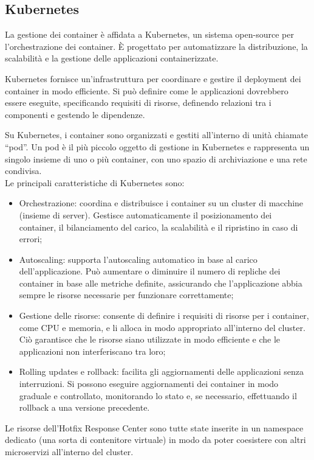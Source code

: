 \subsection{Kubernetes}
La gestione dei container è affidata a Kubernetes, un sistema open-source per 
l'orchestrazione dei container. È progettato per automatizzare la distribuzione, 
la scalabilità e la gestione delle applicazioni containerizzate.

Kubernetes fornisce un'infrastruttura per coordinare e gestire il deployment 
dei container in modo efficiente. Si può definire come le applicazioni dovrebbero 
essere eseguite, specificando requisiti di risorse, definendo relazioni tra i 
componenti e gestendo le dipendenze.

Su Kubernetes, i container sono organizzati e gestiti all'interno di unità 
chiamate “pod”. Un pod è il più piccolo oggetto di gestione in Kubernetes e 
rappresenta un singolo insieme di uno o più container, con uno spazio di 
archiviazione e una rete condivisa. ~\cite{kube:what-is-kubernetes}\\

\noindent Le principali caratteristiche di  Kubernetes sono:
\begin{itemize}
\item Orchestrazione: coordina e distribuisce i container su un cluster di macchine (insieme di server). Gestisce automaticamente il posizionamento dei container, il bilanciamento del carico, la scalabilità e il ripristino in caso di errori;
\item Autoscaling: supporta l'autoscaling automatico in base al carico dell'applicazione. Può aumentare o diminuire il numero di repliche dei container in base alle metriche definite, assicurando che l'applicazione abbia sempre le risorse necessarie per funzionare correttamente;
\item Gestione delle risorse: consente di definire i requisiti di risorse per i container, come CPU e memoria, e li alloca in modo appropriato all'interno del cluster. Ciò garantisce che le risorse siano utilizzate in modo efficiente e che le applicazioni non interferiscano tra loro;
\item Rolling updates e rollback: facilita gli aggiornamenti delle applicazioni senza interruzioni. Si possono eseguire aggiornamenti dei container in modo graduale e controllato, monitorando lo stato e, se necessario, effettuando il rollback a una versione precedente.
\end{itemize}

Le risorse dell’Hotfix Response Center sono tutte state inserite in un namespace 
dedicato (una sorta di contenitore virtuale) in modo da poter coesistere con 
altri microservizi all'interno del cluster.\\


